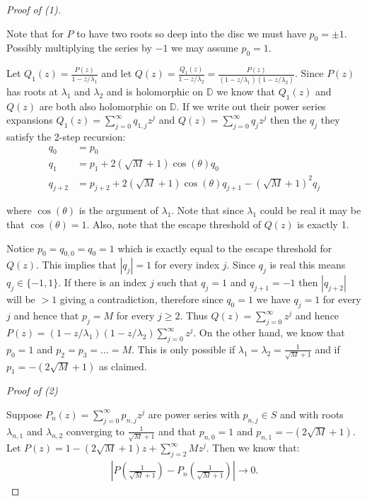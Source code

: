 \documentclass[10pt,a4paper]{amsart}
\begin{document}
\begin{proof}[Proof of (1)]

\

Note that for $P$ to have two roots so deep into the disc we must have $p_0 = \pm 1$. Possibly multiplying the series by $-1$ we may assume $p_0 = 1$. 

Let $Q_1(z) = \frac{P(z)}{1-z/\lambda_1}$ and let $Q(z) = \frac{Q_1(z)}{1-z/\lambda_2} = \frac{P(z)}{(1-z/\lambda_1)(1-z/\lambda_2)}$. Since $P(z)$ has roots at $\lambda_1$ and $\lambda_2$ and is holomorphic on $\mathbb{D}$ we know that $Q_1(z)$ and $Q(z)$ are both also holomorphic on $\mathbb{D}$. If we write out their power series expansions $Q_1(z) = \sum_{j=0}^\infty q_{1, j}z^j$ and $Q(z) = \sum_{j=0}^\infty q_jz^j$ then the $q_j$ they satisfy the 2-step recursion:
\begin{align*}
q_0 &= p_0 \\
q_1 &= p_1 + 2(\sqrt{M}+1)\cos(\theta)q_0 \\
q_{j+2} &= p_{j+2} + 2(\sqrt{M}+1)\cos(\theta)q_{j+1} - (\sqrt{M}+1)^2q_j
\end{align*}

where $\cos(\theta)$ is the argument of $\lambda_1$. Note that since $\lambda_1$ could be real it may be that $\cos(\theta) = 1$. Also, note that the escape threshold of $Q(z)$ is exactly 1.

Notice $p_0 = q_{0, 0} = q_0 = 1$ which is exactly equal to the escape threshold for $Q(z)$. This implies that $|q_j| = 1$ for every index $j$. Since $q_j$ is real this means $q_j \in \{-1, 1 \}$. If there is an index $j$ such that $q_j = 1$ and $q_{j+1} = -1$ then $|q_{j+2}|$ will be $> 1$ giving a contradiction, therefore since $q_0 = 1$ we have $q_j = 1$ for every $j$ and hence that $p_j = M$ for every $j \geqslant 2$. Thus $Q(z) = \sum_{j=0}^\infty z^j$ and hence $P(z) = (1-z/\lambda_1)(1-z/\lambda_2)\sum_{j=0}^\infty z^j$. On the other hand, we know that $p_0 = 1$ and $p_2 = p_3 = ... = M$. This is only possible if $\lambda_1 = \lambda_2 = \frac{1}{\sqrt{M}+1}$ and if $p_1 = -(2\sqrt{M} + 1)$ as claimed.



\bigskip
\noindent \textit{Proof of (2)}


Suppose $P_n(z) = \sum_{j=0}^\infty p_{n, j}z^j$ are power series with $p_{n, j} \in S$ and with roots $\lambda_{n, 1}$ and $\lambda_{n, 2}$ converging to $\frac{1}{\sqrt{M} + 1}$ and that $p_{n, 0} = 1$ and $p_{n, 1} = -(2\sqrt{M} + 1)$. Let $P(z) = 1-(2\sqrt{M}+1)z + \sum_{j=2}^\infty Mz^j$. Then we know that:
\begin{align*}
|P(\frac{1}{\sqrt{M} + 1}) - P_n(\frac{1}{\sqrt{M}+1}) | \rightarrow 0.
\end{align*}


\end{proof}
\end{document}
